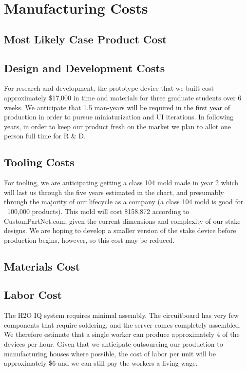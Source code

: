 \documentclass[11pt]{article}
\begin{document}
\section{Manufacturing Costs}

\subsection{Most Likely Case Product Cost}
\subsection{Design and Development Costs}

For research and development, the prototype device that we built cost approximately \$17,000 in time and materials for three graduate students over 6 weeks.  We anticipate that 1.5 man-years will be required in the first year of production in order to pursue miniaturization and UI iterations.  In following years, in order to keep our product fresh on the market we plan to allot one person full time for R \& D.

\subsection{Tooling Costs}

For tooling, we are anticipating getting a class 104 mold made in year 2 which will last us through the five years estimated in the chart, and presumably through the majority of our lifecycle as a company (a class 104 mold is good for ~100,000 products).  This mold will cost \$158,872 according to CustomPartNet.com, given the current dimensions and complexity of our stake designs.  We are hoping to develop a smaller version of the stake device before production begins, however, so this cost may be reduced.

\subsection{Materials Cost}
\subsection{Labor Cost}

The H2O IQ system requires minimal assembly.  The circuitboard has very few components that require soldering, and the server comes completely assembled.  We therefore estimate that a single worker can produce approximately 4 of the devices per hour.  Given that we anticipate outsourcing our production to manufacturing houses where possible, the cost of labor per unit will be approximately \$6 and we can still pay the workers a living wage.
\end{document}
